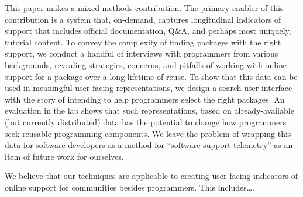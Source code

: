 This paper makes a mixed-methods contribution.
The primary enabler of this contribution is a system that, on-demand, captures longitudinal indicators of support that includes official documentation, Q\&A, and perhaps most uniquely, tutorial content.
To convey the complexity of finding packages with the right support, we conduct a handful of interviews with programmers from various backgrounds, revealing strategies, concerns, and pitfalls of working with online support for a package over a long lifetime of reuse.
To show that this data can be used in meaningful user-facing representations, we design a search user interface with the story of intending to help programmers select the right packages.
An evaluation in the lab shows that such representations, based on already-available (but currently distributed) data has the potential to change how programmers seek reusable programming components.
We leave the problem of wrapping this data for software developers as a method for ``software support telemetry'' as an item of future work for ourselves.

We believe that our techniques are applicable to creating user-facing indicators of online support for communities besides programmers.
This includes\ldots{}.
\fi
